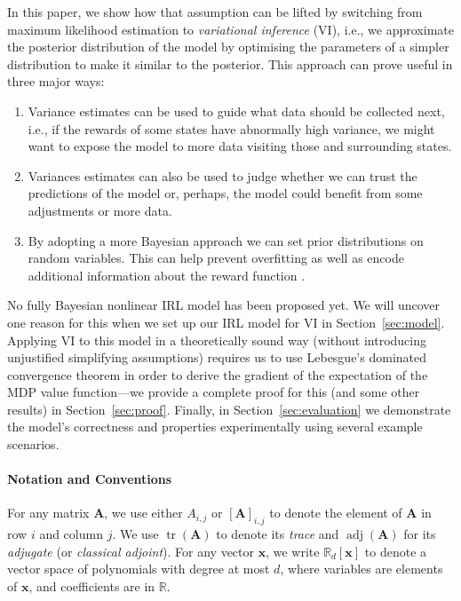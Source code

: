 \documentclass{mpaper}
\DeclareMathOperator{\adj}{adj}
\DeclareMathOperator{\tr}{tr}
\begin{document}
In this paper, we show how that assumption can be lifted by switching from
maximum likelihood estimation to \emph{variational inference} (VI), i.e., we
approximate the posterior distribution of the model by optimising the parameters
of a simpler distribution to make it similar to the posterior. This approach can
prove useful in three major ways:
\begin{enumerate}
\item Variance estimates can be used to guide what data should be collected
  next, i.e., if the rewards of some states have abnormally high variance, we
  might want to expose the model to more data visiting those and surrounding
  states.
\item Variances estimates can also be used to judge whether we can trust the
  predictions of the model or, perhaps, the model could benefit from some
  adjustments or more data.
\item By adopting a more Bayesian approach we can set prior distributions on
  random variables. This can help prevent overfitting as well as encode
  additional information about the reward function
  \cite{DBLP:conf/uai/JinDAS17}.
\end{enumerate}

No fully Bayesian nonlinear IRL model has been proposed yet. We will uncover one
reason for this when we set up our IRL model for VI in Section~\ref{sec:model}.
Applying VI to this model in a theoretically sound way (without introducing
unjustified simplifying assumptions) requires us to use Lebesgue's dominated
convergence theorem in order to derive the gradient of the expectation of the
MDP value function---we provide a complete proof for this (and some other
results) in Section~\ref{sec:proof}. Finally, in Section~\ref{sec:evaluation} we
demonstrate the model's correctness and properties experimentally using several
example scenarios.

\paragraph{Notation and Conventions}

For any matrix $\mathbf{A}$, we use either $A_{i,j}$ or
$[\mathbf{A}]_{i,j}$ to denote the element of $\mathbf{A}$ in row $i$ and column
$j$. We use $\tr(\mathbf{A})$ to denote its \emph{trace} and $\adj(\mathbf{A})$
for its \emph{adjugate} (or \emph{classical adjoint}). For any vector
$\mathbf{x}$, we write $\mathbb{R}_d[\mathbf{x}]$ to denote a vector space of
polynomials with degree at most $d$, where variables are elements of
$\mathbf{x}$, and coefficients are in $\mathbb{R}$.
\end{document}
